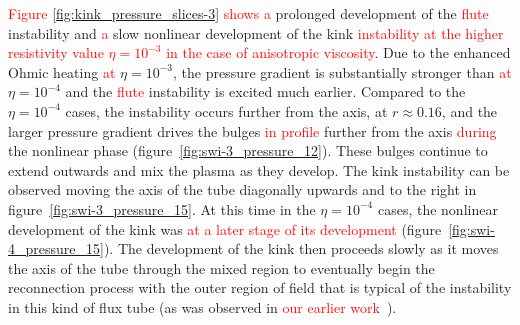 \documentclass[12pt]{article}
\newcommand{\rs}[2]{\textcolor{red}{#2}}
\begin{document}
\rs{Figures \ref{fig:kink_pressure_slices-3} show the}{Figure
  \ref{fig:kink_pressure_slices-3} shows a} prolonged 
development of the \rs{fluting}{flute} instability and \rs{the}{a} slow
nonlinear development of the kink \rs{}{instability at the higher
  resistivity value $\eta=10^{-3}$ in the case of anisotropic viscosity}. Due to the enhanced Ohmic heating 
\rs{when}{at} $\eta=10^{-3}$, the pressure gradient is substantially stronger
than \rs{when}{at} $\eta=10^{-4}$ and the \rs{fluting}{flute} instability is
excited much earlier. Compared to the $\eta=10^{-4}$ cases, the
instability occurs further from the axis, at $r\approx0.16$, and the
larger pressure gradient drives the bulges \rs{}{in profile} further
from the axis \rs{in}{during} the nonlinear phase
(figure~\ref{fig:swi-3_pressure_12}). These bulges continue to extend
outwards and mix the plasma as they develop. The kink instability can
be observed moving the axis of the tube diagonally upwards and to the
right in figure~\ref{fig:swi-3_pressure_15}. At this time in the
$\eta=10^{-4}$ cases, the nonlinear development of the kink was
\rs{further along}{at a later stage of its development} (figure~\ref{fig:swi-4_pressure_15}). The development of
the kink then proceeds slowly as it moves the axis of the tube through
the mixed region to eventually begin the reconnection process with the
outer region of field that is typical of the instability in this kind
of flux tube (as was observed in
\rs{chapter}{our earlier work}~\cite{quinnEffectAnisotropicViscosity2020a}). 
\end{document}
